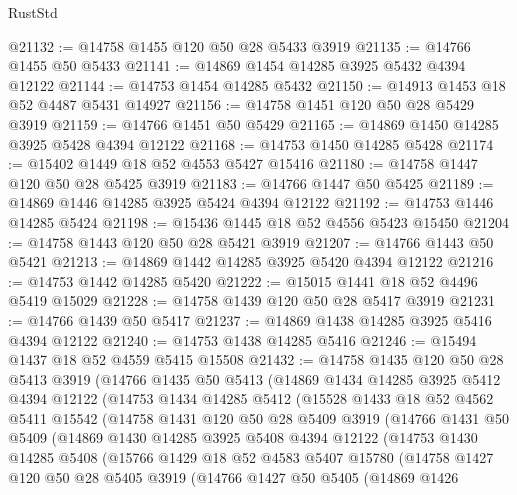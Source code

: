 \begin{lexlean}{RustStd}
\begin{coremodule}
@21132 := @14758 @1455 @120 @50 @28 @5433 @3919
@21135 := @14766 @1455 @50 @5433
@21141 := @14869 @1454 @14285 @3925 @5432 @4394 @12122
@21144 := @14753 @1454 @14285 @5432
@21150 := @14913 @1453 @18 @52 @4487 @5431 @14927
@21156 := @14758 @1451 @120 @50 @28 @5429 @3919
@21159 := @14766 @1451 @50 @5429
@21165 := @14869 @1450 @14285 @3925 @5428 @4394 @12122
@21168 := @14753 @1450 @14285 @5428
@21174 := @15402 @1449 @18 @52 @4553 @5427 @15416
@21180 := @14758 @1447 @120 @50 @28 @5425 @3919
@21183 := @14766 @1447 @50 @5425
@21189 := @14869 @1446 @14285 @3925 @5424 @4394 @12122
@21192 := @14753 @1446 @14285 @5424
@21198 := @15436 @1445 @18 @52 @4556 @5423 @15450
@21204 := @14758 @1443 @120 @50 @28 @5421 @3919
@21207 := @14766 @1443 @50 @5421
@21213 := @14869 @1442 @14285 @3925 @5420 @4394 @12122
@21216 := @14753 @1442 @14285 @5420
@21222 := @15015 @1441 @18 @52 @4496 @5419 @15029
@21228 := @14758 @1439 @120 @50 @28 @5417 @3919
@21231 := @14766 @1439 @50 @5417
@21237 := @14869 @1438 @14285 @3925 @5416 @4394 @12122
@21240 := @14753 @1438 @14285 @5416
@21246 := @15494 @1437 @18 @52 @4559 @5415 @15508
@21432 := @14758
    @1435
    @120
    @50
    @28
    @5413
    @3919
    (@14766
      @1435
      @50
      @5413
      (@14869
        @1434
        @14285
        @3925
        @5412
        @4394
        @12122
        (@14753
          @1434
          @14285
          @5412
          (@15528
            @1433
            @18
            @52
            @4562
            @5411
            @15542
            (@14758
              @1431
              @120
              @50
              @28
              @5409
              @3919
              (@14766
                @1431
                @50
                @5409
                (@14869
                  @1430
                  @14285
                  @3925
                  @5408
                  @4394
                  @12122
                  (@14753
                    @1430
                    @14285
                    @5408
                    (@15766
                      @1429
                      @18
                      @52
                      @4583
                      @5407
                      @15780
                      (@14758
                        @1427
                        @120
                        @50
                        @28
                        @5405
                        @3919
                        (@14766
                          @1427
                          @50
                          @5405
                          (@14869
                            @1426

\end{coremodule}
\end{lexlean}
